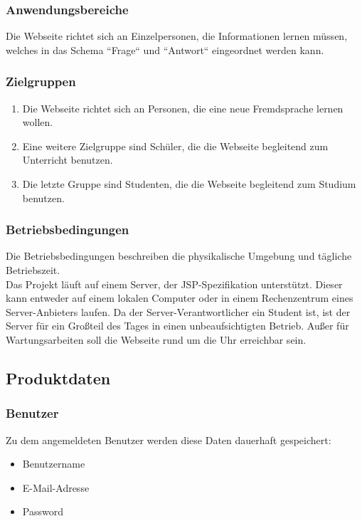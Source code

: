 \subsubsection{Anwendungsbereiche}
Die Webseite richtet sich an Einzelpersonen, die Informationen lernen müssen, welches in das Schema ``Frage`` und ``Antwort`` eingeordnet werden kann.

\subsubsection{Zielgruppen}
\begin{enumerate}[leftmargin=2cm, label=\bfseries /ZG\arabic*0/]
	\item Die Webseite richtet sich an Personen, die eine neue Fremdsprache lernen wollen.
	\item Eine weitere Zielgruppe sind Schüler, die die Webseite begleitend zum Unterricht benutzen.
	\item Die letzte Gruppe sind Studenten, die die Webseite begleitend zum Studium benutzen.
\end{enumerate}


\subsubsection{Betriebsbedingungen}
Die Betriebsbedingungen beschreiben die physikalische Umgebung und tägliche Betriebszeit.\\

\noindent Das Projekt läuft auf einem Server, der JSP-Spezifikation unterstützt. Dieser kann entweder auf einem lokalen Computer oder in einem Rechenzentrum eines Server-Anbieters laufen. Da der Server-Verantwortlicher ein Student ist, ist der Server für ein Großteil des Tages in einen unbeaufsichtigten Betrieb. Außer für Wartungsarbeiten soll die Webseite rund um die Uhr erreichbar sein.


\subsection{Produktdaten}
\subsubsection{Benutzer}
Zu dem angemeldeten Benutzer werden diese Daten dauerhaft gespeichert:
\begin{itemize}
	\item Benutzername
	\item E-Mail-Adresse
	\item Password
\end{itemize}

